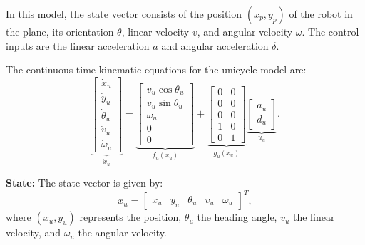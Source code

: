 \documentclass{svproc}
\begin{document}
        In this model, the state vector consists of the position $(x_p, y_p)$ of
        the robot in the plane, its orientation $\theta$, linear velocity $v$,
        and angular velocity $\omega$. The control inputs are the linear
        acceleration $a$ and angular acceleration $\delta$.

        The continuous-time kinematic equations for the unicycle model are:
        \begin{equation}
            \label{eq:unicycle_model}
            \underbrace{
            \begin{bmatrix}
                \dot{x}_{u}\\
                \dot{y}_{u}\\
                \dot{\theta}_{u}\\
                \dot{v}_{u}\\
                \dot{\omega}_{u}
            \end{bmatrix}
            }_{\dot{x}_{u}}
            =
            \underbrace{
            \begin{bmatrix}
                v_{u}\cos{\theta_{u}}\\
                v_{u}\sin{\theta_{u}}\\
                \omega_{u}\\
                0\\
                0
            \end{bmatrix}
            }_{f_{u}(x_{u})}
            +
            \underbrace{
            \begin{bmatrix}
                0   &   0\\
                0   &   0\\
                0   &   0\\
                1   &   0\\
                0   &   1
            \end{bmatrix}
            }_{g_{u}(x_{u})}
            \underbrace{
            \begin{bmatrix}
                a_{u}\\
                d_{u}
            \end{bmatrix}
            }_{u_{u}}.
        \end{equation}

        \textbf{State:}
        The state vector is given by:
        \[
            x_{u} =
            \begin{bmatrix}
                x_{u} & y_{u} & \theta_{u} & v_{u} & \omega_{u}
            \end{bmatrix}^{T},
        \]
        where $(x_{u}, y_{u})$ represents the position, $\theta_{u}$ the heading
        angle, $v_{u}$ the linear velocity, and $\omega_{u}$ the angular velocity.
\end{document}
